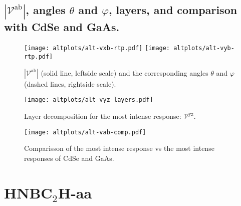 \documentclass{article}
\let\Oldsection\section
\renewcommand{\section}{\FloatBarrier\Oldsection}
\let\Oldsubsection\subsection
\renewcommand{\subsection}{\FloatBarrier\Oldsubsection}
\begin{document}
\subsection{$|\mathcal{V}^{\mathrm{ab}}|$, angles
$\theta$ and $\varphi$, layers, and comparison with CdSe and GaAs.}
\begin{figure}[ht]
    \centering
    \texttt{[image: altplots/alt-vxb-rtp.pdf]}
    \texttt{[image: altplots/alt-vyb-rtp.pdf]}
    \caption{$|\mathcal{V}^{\mathrm{ab}}|$ (solid line, leftside scale) and the
    corresponding angles $\theta$ and $\varphi$ (dashed lines, rightside scale).}
    \label{fig:alt-rtp}
\end{figure}

\begin{figure}[ht]
    \centering
    \texttt{[image: altplots/alt-vyz-layers.pdf]}
    \caption{Layer decomposition for the most intense response:
    $\mathcal{V}^{\mathrm{yz}}$.}
    \label{fig:alt-lay}
\end{figure}

\begin{figure}[ht]
    \centering
    \texttt{[image: altplots/alt-vab-comp.pdf]}
    \caption{Comparisson of the most intense response vs the most intense
    responses of CdSe and GaAs.}
    \label{fig:alt-comp}
\end{figure}





\section{HNBC$_{2}$H-aa} %

\end{document}
